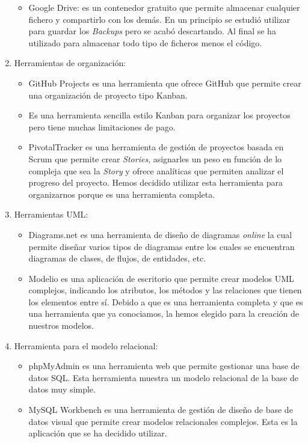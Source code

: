 \documentclass[11pt]{article}
\begin{document}
\begin{enumerate}
\begin{itemize}
		\item Google Drive: es un contenedor gratuito que permite almacenar cualquier fichero y compartirlo con los demás. En un principio se estudió utilizar para guardar los \textit{Backups} pero se acabó descartando. Al final se ha utilizado para almacenar todo tipo de ficheros menos el código.
	\end{itemize}
	\item Herramientas de organización: 
	\begin{itemize} 
		\item GitHub Projects es una herramienta que ofrece GitHub que permite crear una organización de proyecto tipo Kanban.
		\item Es una herramienta sencilla estilo Kanban para organizar los proyectos pero tiene muchas limitaciones de pago.
		\item PivotalTracker es una herramienta de gestión de proyectos basada en Scrum que permite crear \textit{Stories}, asignarles un peso en función de lo compleja que sea la \textit{Story} y ofrece analíticas que permiten analizar el progreso del proyecto. Hemos decidido utilizar esta herramienta para organizarnos porque es una herramienta completa.
	\end{itemize}
	\item Herramientas UML: 
	\begin{itemize} 
		\item Diagrams.net es una herramienta de diseño de diagramas \textit{online} la cual permite diseñar varios tipos de diagramas entre los cuales se encuentran diagramas de clases, de flujos, de entidades, etc.
		\item Modelio es una aplicación de escritorio que permite crear modelos UML complejos, indicando los atributos, los métodos y las relaciones que tienen los elementos entre sí. Debido a que es una herramienta completa y que es una herramienta que ya conociamos, la hemos elegido para la creación de nuestros modelos.
	\end{itemize}
	\item Herramienta para el modelo relacional: 
	\begin{itemize} 
		\item phpMyAdmin es una herramienta web que permite gestionar una base de datos SQL. Esta herramienta muestra un modelo relacional de la base de datos muy simple.
		\item MySQL Workbench es una herramienta de gestión de diseño de base de datos visual que permite crear modelos relacionales complejos. Esta es la aplicación que se ha decidido utilizar.

\end{itemize}
\end{enumerate}
\end{document}
